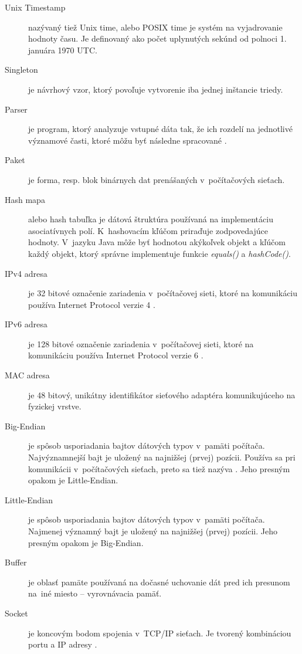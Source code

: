\documentclass[]{tukediphc}
\begin{document}
\begin{description}
	\item[Unix Timestamp] nazývaný tiež Unix time, alebo POSIX time je systém na vyjadrovanie 
	hodnoty času. Je definovaný ako počet uplynutých sekúnd od polnoci 1. januára 1970 UTC.
	
	\item[Singleton] je návrhový vzor, ktorý povoľuje vytvorenie iba jednej inštancie triedy. 
	
	\item[Parser] je program, ktorý analyzuje vstupné dáta tak, že ich rozdelí na jednotlivé 
	významové časti, ktoré môžu byť následne spracované \citep{veri}.
	
	\item[Paket] je forma, resp. blok binárnych dat prenášaných v~počítačových sieťach.
	
	\item[Hash mapa] alebo hash tabuľka je dátová štruktúra používaná na implementáciu asociatívnych 
	polí. K~hashovacím kľúčom priraďuje zodpovedajúce hodnoty. V~jazyku Java môže byť hodnotou 
	akýkoľvek objekt a kľúčom každý objekt, ktorý správne implementuje funkcie \emph{equals()} a 
	\emph{hashCode()}.
	
	\item[IPv4 adresa] je 32 bitové označenie zariadenia v~počítačovej sieti, ktoré na komunikáciu 
	používa Internet Protocol verzie 4 \citep{rfc791}.
	
	\item[IPv6 adresa] je 128 bitové označenie zariadenia v~počítačovej sieti, ktoré na komunikáciu 
	používa Internet Protocol verzie 6 \citep{rfc2460}.
	
	\item[MAC adresa] je 48 bitový, unikátny identifikátor sieťového adaptéra komunikujúceho na 
	fyzickej vrstve. 
	
	\item[Big-Endian] je spôsob usporiadania bajtov dátových typov v~pamäti počítača. Najvýznamnejší 
	bajt je uložený na najnižšej (prvej) pozícii. Používa sa pri komunikácii v~počítačových sieťach,
	preto sa tiež nazýva . Jeho presným opakom je Little-Endian.
	
	\item[Little-Endian] je spôsob usporiadania bajtov dátových typov v~pamäti počítača. Najmenej 
	významný bajt je uložený na najnižšej (prvej) pozícii. Jeho presným opakom je Big-Endian.
	
	\item[Buffer] je oblasť pamäte používaná na dočasné uchovanie dát pred ich presunom na~iné 
	miesto -- vyrovnávacia pamäť.
	
	\item[Socket] je koncovým bodom spojenia v~TCP/IP sieťach. Je tvorený kombináciou portu a IP 
	adresy \citep{linktionary}.
\end{description}

\kslovnikterminov
%
\pagestyle{headings}

%

%

%
%
%
%
%

%

%

%

%

%

%
\end{document}
